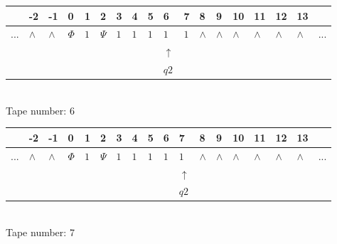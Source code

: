 \documentclass[11pt]{article}
\begin{document}
\begin{table}[H]
\centering
\begin{tabular}{llllllllllllllllll}
 & -2 & -1 & 0 & 1 & 2 & 3 & 4 & 5 & 6 & 7 & 8 & 9 & 10 & 11 & 12 & 13 & \\
\hline
$...$ & \multicolumn{1}{|l|}{$\wedge$} & \multicolumn{1}{|l|}{$\wedge$} & \multicolumn{1}{|l|}{$\Phi$} & \multicolumn{1}{|l|}{$1$} & \multicolumn{1}{|l|}{$\Psi$} & \multicolumn{1}{|l|}{$1$} & \multicolumn{1}{|l|}{$1$} & \multicolumn{1}{|l|}{$1$} & \multicolumn{1}{|l|}{$1$} & \multicolumn{1}{|l|}{$1$} & \multicolumn{1}{|l|}{$\wedge$} & \multicolumn{1}{|l|}{$\wedge$} & \multicolumn{1}{|l|}{$\wedge$} & \multicolumn{1}{|l|}{$\wedge$} & \multicolumn{1}{|l|}{$\wedge$} & \multicolumn{1}{|l|}{$\wedge$} & $...$\\
\hline
&  &  &  &  &  &  &  &  & $\uparrow$ &  &  &  &  &  &  &  &  \\
&  &  &  &  &  &  &  &  & $ q2 $ &  &  &  &  &  &  &  &  \\
\end{tabular}
\\
Tape number: 6
\noindent\makebox[\linewidth]{\hdashrule{\textwidth}{1pt}{1pt}}\end{table}

\begin{table}[H]
\centering
\begin{tabular}{llllllllllllllllll}
 & -2 & -1 & 0 & 1 & 2 & 3 & 4 & 5 & 6 & 7 & 8 & 9 & 10 & 11 & 12 & 13 & \\
\hline
$...$ & \multicolumn{1}{|l|}{$\wedge$} & \multicolumn{1}{|l|}{$\wedge$} & \multicolumn{1}{|l|}{$\Phi$} & \multicolumn{1}{|l|}{$1$} & \multicolumn{1}{|l|}{$\Psi$} & \multicolumn{1}{|l|}{$1$} & \multicolumn{1}{|l|}{$1$} & \multicolumn{1}{|l|}{$1$} & \multicolumn{1}{|l|}{$1$} & \multicolumn{1}{|l|}{$1$} & \multicolumn{1}{|l|}{$\wedge$} & \multicolumn{1}{|l|}{$\wedge$} & \multicolumn{1}{|l|}{$\wedge$} & \multicolumn{1}{|l|}{$\wedge$} & \multicolumn{1}{|l|}{$\wedge$} & \multicolumn{1}{|l|}{$\wedge$} & $...$\\
\hline
&  &  &  &  &  &  &  &  &  & $\uparrow$ &  &  &  &  &  &  &  \\
&  &  &  &  &  &  &  &  &  & $ q2 $ &  &  &  &  &  &  &  \\
\end{tabular}
\\
Tape number: 7
\noindent\makebox[\linewidth]{\hdashrule{\textwidth}{1pt}{1pt}}\end{table}
\end{document}
